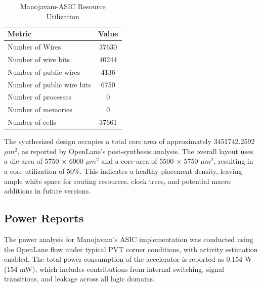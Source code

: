 \begin{table}
	\centering
	\fontsize{10}{12}\selectfont
	\caption{Manojavam-ASIC Resource Utilization}
	\label{tab:manojavam-asic-utilization-report}
	\begin{tabular}{|p{6cm}|c|}
		\hline
		\textbf{Metric}& \textbf {Value}\\
		\hline
		Number of Wires & 37630\\\hline
		Number of wire bits & 40244\\\hline
		Number of public wires & 4136\\\hline
		Number of public wire bits & 6750\\\hline
		Number of processes & 0\\\hline
		Number of memories & 0\\\hline
		Number of cells & 37661\\\hline
	\end{tabular}
\end{table} 

The synthesized design occupies a total core area of approximately 3451742.2592 $\mu m^{2}$, as reported by OpenLane's post-synthesis analysis. The overall layout uses a die-area of 5750 × 6000 $\mu m^{2}$ and a core-area of 5500 × 5750 $\mu m^{2}$, resulting in a core utilization of 50\%. This indicates a healthy placement density, leaving ample white space for routing resources, clock trees, and potential macro additions in future versions.

\subsection{Power Reports}
The power analysis for Manojavam's ASIC implementation was conducted using the OpenLane flow under typical PVT corner conditions, with activity estimation enabled. The total power consumption of the accelerator is reported as 0.154 W (154 mW), which includes contributions from internal switching, signal transitions, and leakage across all logic domains.

